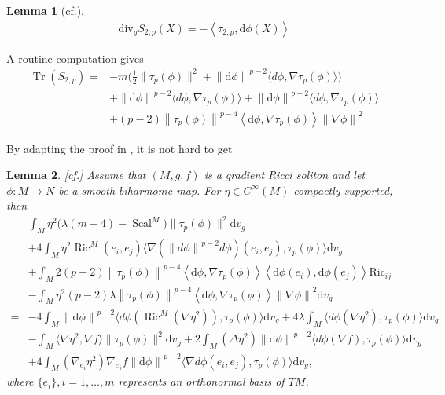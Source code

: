 \documentclass[12pt,UTF8]{article}
\theoremstyle{plain}
\newtheorem{lem}{Lemma}
\theoremstyle{definition}
\def\d {\mathrm{d}}
\def\Ric {\mathrm{Ric}}
\def\div{\mathrm{div}}
\def\na{\ensuremath{\nabla}}
\renewcommand{\d}[1]{\mathbb{#1}}
\renewcommand{\(}{\left(}
\renewcommand{\)}{\right)}
\DeclareMathOperator{\Tr}{Tr}
\newcommand{\norm}[1]{\left\lVert#1\right\rVert}%
\def\Ric{\mathrm{Ric\, }}
\numberwithin{equation}{subsection}
\def\na{\nabla}
\newcommand{\dv}{\operatorname{div}}
\renewcommand{\div}{\mbox{div }}
\renewcommand{\(}{\left(}
\renewcommand{\)}{\right)}
\def\d{\mathrm{d}}
\def \d {\mathrm{d}}
\def \Ric {\mathrm{Ric}}
\def \div{\mathrm{div}}
\def\la{\lambda}
\def\dv{\d v_g}
\numberwithin{equation}{section}
\begin{document}
\begin{lem}[cf.\cite{zbMATH07894526}]
	\begin{equation}
		\begin{split}
			\div_g S_{2,p}(X)=-\left\langle \tau_{2,p} , \d \phi(X)  \right\rangle
		\end{split}
	\end{equation}
\end{lem}
A routine computation gives 
	$$
\begin{aligned}
\Tr(S_{2,p})=&-m\big(\frac{1}{2}\|\tau_p(\phi)\|^{2}+\norm{\d \phi}^{p-2}\langle d\phi,\na\tau_p(\phi)\rangle\big)\\
&+\norm{\d \phi}^{p-2}\langle d\phi,\na\tau_p(\phi)\rangle+\norm{\d \phi}^{p-2}\langle d\phi,\na\tau_p(\phi)\rangle\\
&+(p-2)\norm{\tau_p(\phi)}^{p-4}\left\langle \d \phi,\na \tau_p(\phi) \right\rangle\norm{\na \phi}^2	
\end{aligned}
$$


 By adapting the proof  in \cite{MR4674270}  \cite{MR4993852}, it is not hard to get
\begin{lem}\label{im-1}[cf.\cite{zbMATH07894526}]
	Assume that $(M,g,f)$ is a gradient Ricci soliton and
	let $\phi\colon M\to N$ be a smooth biharmonic map.
	For $\eta\in C^\infty(M)$ compactly supported, then 
\begin{equation}\label{13}
	\begin{split}
			&\int_M\eta^2\big(\lambda(m-4)-\operatorname{Scal}^M\big)\|\tau_p(\phi)\|^2\dv\\
			&+4\int_M\eta^2\operatorname{Ric}^M(e_i,e_j)\langle\na \left(\norm{d\phi}^{p-2} d\phi \right)(e_i,e_j),\tau_p(\phi)\rangle \dv \\
		&+\int_M 2(p-2)\norm{\tau_p(\phi)}^{p-4}\left\langle \d \phi,\na \tau_p(\phi) \right\rangle\left\langle \d \phi(e_i),\d \phi(e_j) \right\rangle\Ric_{ij}\\&-\int_M \eta^2(p-2)\la\norm{\tau_p(\phi)}^{p-4}\left\langle \d \phi,\na \tau_p(\phi) \right\rangle\norm{\na \phi}^2 \dv\\
		=&
		-4\int_M\norm{\d \phi}^{p-2}\langle d\phi(\operatorname{Ric}^M(\nabla\eta^2)),\tau_p(\phi)\rangle \dv 
		+4\lambda\int_M\langle d\phi(\nabla\eta^2),\tau_p(\phi)\rangle \dv 
		\\
		&-\int_M\langle\nabla\eta^2,\nabla f\rangle\|\tau_p(\phi)\|^2 \dv +2\int_M(\Delta\eta^2)\norm{\d \phi}^{p-2}\langle d\phi(\nabla f),\tau_p(\phi)\rangle \dv 
		\\&+4\int_M(\nabla_{e_i}\eta^2)\nabla_{e_j}f\norm{\d \phi}^{p-2}\langle\na d\phi(e_i,e_j),\tau_p(\phi)\rangle \dv,
	\end{split}
\end{equation}
	where $\{e_i\},i=1,\ldots,m$ represents an orthonormal basis of $TM$.
\end{lem}
\end{document}
